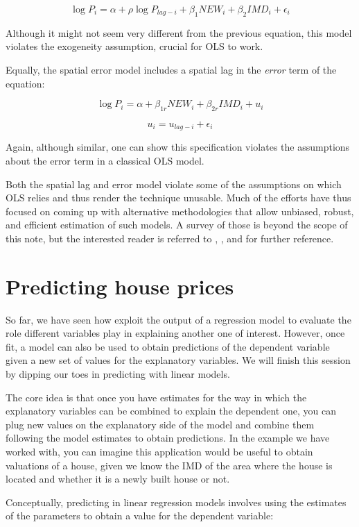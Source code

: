 \documentclass[]{book}
\begin{document}
\[
\log{P_i} = \alpha + \rho \log{P_{lag-i}} + \beta_{1} NEW_i + \beta_{2} IMD_i + \epsilon_i
\]

Although it might not seem very different from the previous equation,
this model violates the exogeneity assumption, crucial for OLS to work.

Equally, the spatial error model includes a spatial lag in the
\emph{error} term of the equation:

\[
\log{P_i} = \alpha + \beta_{1r} NEW_i + \beta_{2r} IMD_i + u_i
\]

\[
u_i = u_{lag-i} + \epsilon_i
\]

Again, although similar, one can show this specification violates the
assumptions about the error term in a classical OLS model.

Both the spatial lag and error model violate some of the assumptions on
which OLS relies and thus render the technique unusable. Much of the
efforts have thus focused on coming up with alternative methodologies
that allow unbiased, robust, and efficient estimation of such models. A
survey of those is beyond the scope of this note, but the interested
reader is referred to \citet{anselin1988spatial},
\citet{anselin2003spatial}, and \citet{anselin2014modern} for further
reference.

\section{Predicting house prices}\label{predicting-house-prices}

So far, we have seen how exploit the output of a regression model to
evaluate the role different variables play in explaining another one of
interest. However, once fit, a model can also be used to obtain
predictions of the dependent variable given a new set of values for the
explanatory variables. We will finish this session by dipping our toes
in predicting with linear models.

The core idea is that once you have estimates for the way in which the
explanatory variables can be combined to explain the dependent one, you
can plug new values on the explanatory side of the model and combine
them following the model estimates to obtain predictions. In the example
we have worked with, you can imagine this application would be useful to
obtain valuations of a house, given we know the IMD of the area where
the house is located and whether it is a newly built house or not.

Conceptually, predicting in linear regression models involves using the
estimates of the parameters to obtain a value for the dependent
variable:
\end{document}
